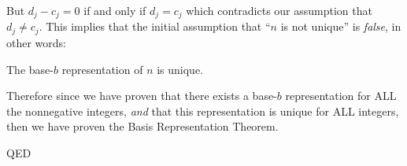 \documentclass{article}
\begin{document}
But $d_j-c_j = 0$ if and only if $d_j = c_j$
which contradicts our assumption that $d_j\ne{}c_j$. This implies that the initial assumption that ``$n$
is not unique'' is \emph{false}, in other words:
\begin{center}
The base-$b$ representation of $n$ is unique.
\end{center}

\bigskip
Therefore since we have proven that there exists a base-$b$
representation for ALL the nonnegative integers, \emph{and}
that this representation is unique for ALL integers, then we
have proven the Basis Representation Theorem.

QED
\end{document}
